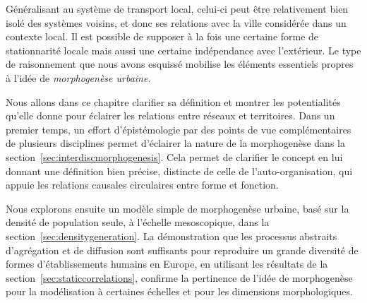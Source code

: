 Généralisant au système de transport local, celui-ci peut être relativement bien isolé des systèmes voisins, et donc ses relations avec la ville considérée dans un contexte local. Il est possible de supposer à la fois une certaine forme de stationnarité locale mais aussi une certaine indépendance avec l'extérieur. Le type de raisonnement que nous avons esquissé mobilise les éléments essentiels propres à l'idée de \emph{morphogenèse urbaine}.



Nous allons dans ce chapitre clarifier sa définition et montrer les potentialités qu'elle donne pour éclairer les relations entre réseaux et territoires. Dans un premier temps, un effort d'épistémologie par des points de vue complémentaires de plusieurs disciplines permet d'éclairer la nature de la morphogenèse dans la section~\ref{sec:interdiscmorphogenesis}. Cela permet de clarifier le concept en lui donnant une définition bien précise, distincte de celle de l'auto-organisation, qui appuie les relations causales circulaires entre forme et fonction.

Nous explorons ensuite un modèle simple de morphogenèse urbaine, basé sur la densité de population seule, à l'échelle mesoscopique, dans la section~\ref{sec:densitygeneration}. La démonstration que les processus abstraits d'agrégation et de diffusion sont suffisants pour reproduire un grande diversité de formes d'établissements humains en Europe, en utilisant les résultats de la section~\ref{sec:staticcorrelations}, confirme la pertinence de l'idée de morphogenèse pour la modélisation à certaines échelles et pour les dimensions morphologiques.

